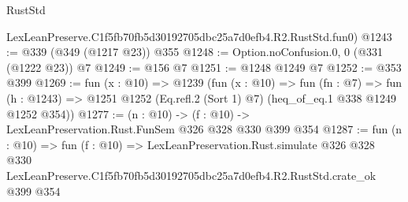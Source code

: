 \begin{lexlean}{RustStd}
\begin{coremodule}
    LexLeanPreserve.C1f5fb70fb5d30192705dbc25a7d0efb4.R2.RustStd.fun0)
@1243 := @339 (@349 (@1217 @23)) @355
@1248 := Option.noConfusion.{0, 0} (@331 (@1222 @23)) @7
@1249 := @156 @7
@1251 := @1248 @1249 @7
@1252 := @353 @399
@1269 := fun (x : @10) =>
  @1239
    (fun (x : @10) =>
    fun (fn : @7) =>
    fun (h : @1243) => @1251 @1252 (Eq.refl.{2} (Sort 1) @7) (heq_of_eq.{1} @338 @1249 @1252 @354))
@1277 := (n : @10) -> (f : @10) -> LexLeanPreservation.Rust.FunSem @326 @328 @330 @399 @354
@1287 := fun (n : @10) =>
  fun (f : @10) =>
  LexLeanPreservation.Rust.simulate
    @326
    @328
    @330
    LexLeanPreserve.C1f5fb70fb5d30192705dbc25a7d0efb4.R2.RustStd.crate_ok
    @399
    @354
\end{coremodule}
\end{lexlean}
